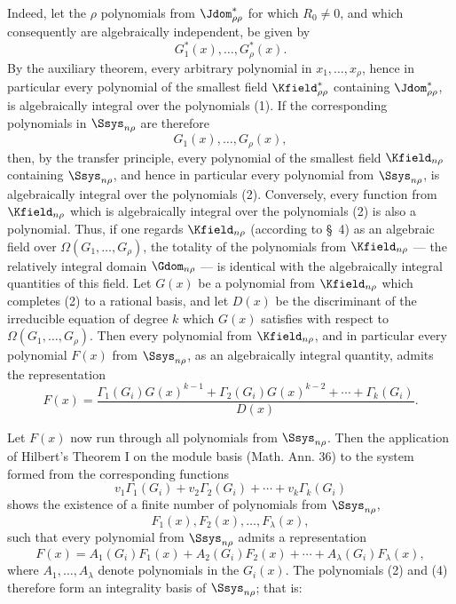 \documentclass[11pt]{article}
\begin{document}
Indeed, let the $\rho$ polynomials from $\Jdom^*_{\rho\rho}$ for which $R_0\ne0$, and which consequently are algebraically independent, be given by
\begin{equation}
  G_1^*(x),\ldots,G_\rho^*(x).
\tag{1}
\end{equation}
By the auxiliary theorem, every arbitrary polynomial in $x_1,
\ldots,x_\rho$, hence in particular every polynomial of the smallest field $\Kfield^*_{\rho\rho}$ containing $\Jdom^*_{\rho\rho}$, is algebraically integral over the polynomials (1). If the corresponding polynomials in $\Ssys_{n\rho}$ are therefore
\begin{equation}
  G_1(x),\ldots,G_\rho(x),
\tag{2}
\end{equation}
then, by the transfer principle, every polynomial of the smallest field $\Kfield_{n\rho}$ containing $\Ssys_{n\rho}$, and hence in particular every polynomial from $\Ssys_{n\rho}$, is algebraically integral over the polynomials (2). Conversely, every function from $\Kfield_{n\rho}$ which is algebraically integral over the polynomials (2) is also a polynomial. Thus, if one regards $\Kfield_{n\rho}$ (according to \S\ 4) as an algebraic field over $\Omega(G_1,
\ldots,G_\rho)$, the totality of the polynomials from $\Kfield_{n\rho}$ --- the relatively integral domain $\Gdom_{n\rho}$ --- is identical with the algebraically integral quantities of this field. Let $G(x)$ be a polynomial from $\Kfield_{n\rho}$ which completes (2) to a rational basis, and let $D(x)$ be the discriminant of the irreducible equation of degree $k$ which $G(x)$ satisfies with respect to $\Omega(G_1,
\ldots,G_\rho)$. Then every polynomial from $\Kfield_{n\rho}$, and in particular every polynomial $F(x)$ from $\Ssys_{n\rho}$, as an algebraically integral quantity, admits the representation
\begin{equation}
  F(x)=\frac{\Gamma_1(G_i)G(x)^{k-1}+\Gamma_2(G_i)G(x)^{k-2}+\cdots+\Gamma_k(G_i)}{D(x)}.
\tag{3}
\end{equation}

Let $F(x)$ now run through all polynomials from $\Ssys_{n\rho}$. Then the application of Hilbert's Theorem I on the module basis (Math. Ann. 36) to the system formed from the corresponding functions
\[
  v_1\Gamma_1(G_i)+v_2\Gamma_2(G_i)+\cdots+v_k\Gamma_k(G_i)
\]
shows the existence of a finite number of polynomials from $\Ssys_{n\rho}$,
\begin{equation}
  F_1(x),F_2(x),\ldots,F_\lambda(x),
\tag{4}
\end{equation}
such that every polynomial from $\Ssys_{n\rho}$ admits a representation
\begin{equation}
  F(x)=A_1(G_i)F_1(x)+A_2(G_i)F_2(x)+\cdots+A_\lambda(G_i)F_\lambda(x),
\tag{5}
\end{equation}
where $A_1,
\ldots,A_\lambda$ denote polynomials in the $G_i(x)$. The polynomials (2) and (4) therefore form an integrality basis of $\Ssys_{n\rho}$; that is:
\end{document}
